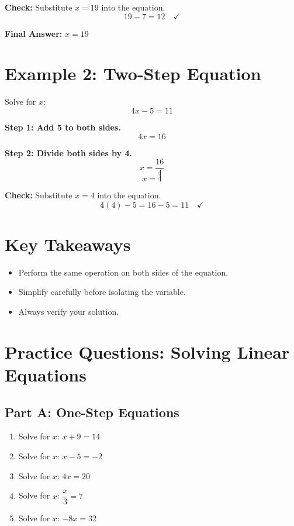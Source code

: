 \documentclass[14pt]{extarticle}
\begin{document}
\textbf{Check:} Substitute \(x = 19\) into the equation.
\[
19 - 7 = 12 \quad \checkmark
\]

\textbf{Final Answer:} \(\boxed{x = 19}\)

\section*{Example 2: Two-Step Equation}

Solve for \(x\):
\[
4x - 5 = 11
\]

\textbf{Step 1: Add 5 to both sides.}
\[
4x = 16
\]

\textbf{Step 2: Divide both sides by 4.}
\[
x = \frac{16}{4}
\]
\[
\boxed{x = 4}
\]

\textbf{Check:} Substitute \(x = 4\) into the equation.
\[
4(4) - 5 = 16 - 5 = 11 \quad \checkmark
\]

\section*{Key Takeaways}
\begin{itemize}
    \item Perform the same operation on both sides of the equation.
    \item Simplify carefully before isolating the variable.
    \item Always verify your solution.
\end{itemize}

\newpage


\section*{Practice Questions: Solving Linear Equations}

\subsection*{Part A: One-Step Equations}
\begin{enumerate}
    \item Solve for \(x\): \(x + 9 = 14\)
    \item Solve for \(x\): \(x - 5 = -2\)
    \item Solve for \(x\): \(4x = 20\)
    \item Solve for \(x\): \(\dfrac{x}{3} = 7\)
    \item Solve for \(x\): \(-8x = 32\)
\end{enumerate}
\end{document}
